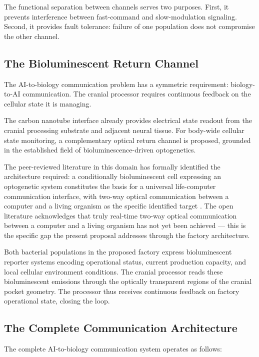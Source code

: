 \documentclass[12pt]{article}
\begin{document}
The functional separation between channels serves two purposes. First, it prevents interference between fast-command and slow-modulation signaling. Second, it provides fault tolerance: failure of one population does not compromise the other channel.

\subsection{The Bioluminescent Return Channel}

The AI-to-biology communication problem has a symmetric requirement: biology-to-AI communication. The cranial processor requires continuous feedback on the cellular state it is managing.

The carbon nanotube interface already provides electrical state readout from the cranial processing substrate and adjacent neural tissue. For body-wide cellular state monitoring, a complementary optical return channel is proposed, grounded in the established field of bioluminescence-driven optogenetics.

The peer-reviewed literature in this domain has formally identified the architecture required: a conditionally bioluminescent cell expressing an optogenetic system constitutes the basis for a universal life-computer communication interface, with two-way optical communication between a computer and a living organism as the specific identified target \cite{bioluminescence_optogenetics_2020}. The open literature acknowledges that truly real-time two-way optical communication between a computer and a living organism has not yet been achieved --- this is the specific gap the present proposal addresses through the factory architecture.

Both bacterial populations in the proposed factory express bioluminescent reporter systems encoding operational status, current production capacity, and local cellular environment conditions. The cranial processor reads these bioluminescent emissions through the optically transparent regions of the cranial pocket geometry. The processor thus receives continuous feedback on factory operational state, closing the loop.

\subsection{The Complete Communication Architecture}

The complete AI-to-biology communication system operates as follows:
\end{document}
